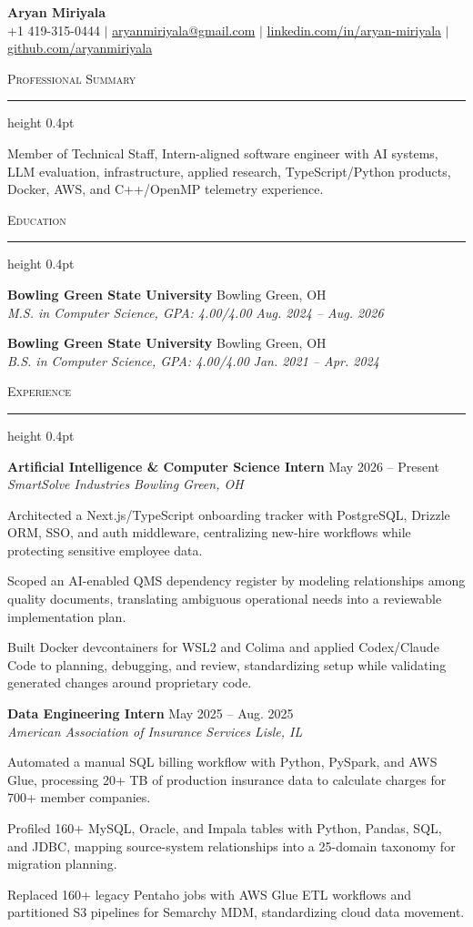 \documentclass[letterpaper,11pt]{article}
\newcommand{\resumesection}[1]{%
  \par\vspace{2pt}%
  {\large\scshape #1}\par\vspace{2pt}%
  \hrule height 0.4pt\vspace{2pt}%
}
\newcommand{\resumeSubheading}[4]{
  \textbf{#1} \hfill #2\\
  \textit{#3} \hfill \textit{#4}
}
\begin{document}
\begin{center}
  {\LARGE \textbf{Aryan Miriyala}}\\[-1pt]
  \small
  +1 419-315-0444 $|$
  \href{mailto:aryanmiriyala@gmail.com}{aryanmiriyala@gmail.com} $|$
  \href{https://www.linkedin.com/in/aryan-miriyala-7788a21b6/}{linkedin.com/in/aryan-miriyala} $|$
  \href{https://github.com/aryanmiriyala}{github.com/aryanmiriyala}
\end{center}\vspace{-10pt}

\resumesection{Professional Summary}
Member of Technical Staff, Intern-aligned software engineer with AI systems, LLM evaluation, infrastructure, applied research, TypeScript/Python products, Docker, AWS, and C++/OpenMP telemetry experience.

\resumesection{Education}
\resumeSubheading
{Bowling Green State University}{Bowling Green, OH}
{M.S. in Computer Science, GPA: 4.00/4.00}{Aug. 2024 -- Aug. 2026}

\resumeSubheading
{Bowling Green State University}{Bowling Green, OH}
{B.S. in Computer Science, GPA: 4.00/4.00}{Jan. 2021 -- Apr. 2024}

\resumesection{Experience}
\resumeSubheading
{Artificial Intelligence \& Computer Science Intern}{May 2026 -- Present}
{SmartSolve Industries}{Bowling Green, OH}
\begin{tightitemize}
  \item Architected a Next.js/TypeScript onboarding tracker with PostgreSQL, Drizzle ORM, SSO, and auth middleware, centralizing new-hire workflows while protecting sensitive employee data.
  \item Scoped an AI-enabled QMS dependency register by modeling relationships among quality documents, translating ambiguous operational needs into a reviewable implementation plan.
  \item Built Docker devcontainers for WSL2 and Colima and applied Codex/Claude Code to planning, debugging, and review, standardizing setup while validating generated changes around proprietary code.
\end{tightitemize}

\resumeSubheading
{Data Engineering Intern}{May 2025 -- Aug. 2025}
{American Association of Insurance Services}{Lisle, IL}
\begin{tightitemize}
  \item Automated a manual SQL billing workflow with Python, PySpark, and AWS Glue, processing 20+ TB of production insurance data to calculate charges for 700+ member companies.
  \item Profiled 160+ MySQL, Oracle, and Impala tables with Python, Pandas, SQL, and JDBC, mapping source-system relationships into a 25-domain taxonomy for migration planning.
  \item Replaced 160+ legacy Pentaho jobs with AWS Glue ETL workflows and partitioned S3 pipelines for Semarchy MDM, standardizing cloud data movement.
\end{tightitemize}
\end{document}
